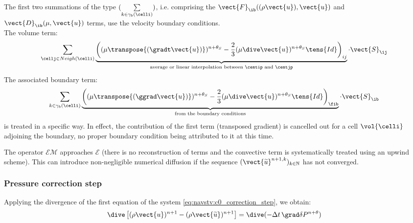 \begin{remark}
The first two summations of the type $(\sum\limits_{k\in {\gamma_b(\celli)}})$,
{i.e.} comprising the $\vect{F}_{\ib}((\rho \vect{u}),\vect{u})$ and
$\vect{D}_{\ib}(\mu,\vect{u})$ terms, use the velocity boundary conditions.\\
The volume term:
\begin{equation*}
\sum\limits_{\cellj \in Neigh(\celli)}{ \underbrace{\left((\mu \transpose{\left(\gradt\vect{u}\right)} )^{n+\theta_{S}}- \frac{2}{3} ( \mu  \dive \vect{u})^{n+\theta_{S}}\tens{Id}\right)_{ij}}_{\text{average or linear interpolation between $\centip$ and $\centjp$}} \cdot \vect{S}_{\ij}}\\
\end{equation*}
The associated boundary term:
\begin{equation*}
\sum\limits_{k\in {\gamma_b(\celli)}}{ \underbrace{\left((\mu \transpose{\left(\ggrad\vect{u}\right)})^{n+\theta_{S}}- \frac{2}{3} ( \mu  \dive \vect{u})^{n+\theta_{S}}\tens{Id}\right)_{\fib}}_\text{from the boundary conditions} \cdot \vect{S}_{\ib}}
\end{equation*}
is treated in a specific way. In effect, the contribution of the first term
(transposed gradient) is cancelled out for a cell $\vol{\celli}$ adjoining the
boundary, no proper boundary condition being attributed to it at this time.
\end{remark}

\begin{remark}
The operator $\mathcal{EM}$ approaches $\mathcal{E}$ (there is no reconstruction
of terms and the convective term is systematically treated using an upwind scheme).
This can introduce non-negligible numerical diffusion if the sequence
$(\vect{\widetilde{u}}^{n+1,k})_{k\in \mathbb{N}}$ has not converged.
\end{remark}

\subsubsection*{Pressure correction step}
Applying the divergence of the first equation of the system
\eqref{eq:navstv:c0_correction_step}, we obtain:
\begin{equation}
\dive\left[(\rho\vect{u})^{n+1}-(\rho\vect{\widetilde{u}})^{n+1}\right]
=\dive(-\Delta t\, \grad  \delta P^{n+\theta})
\end{equation}

